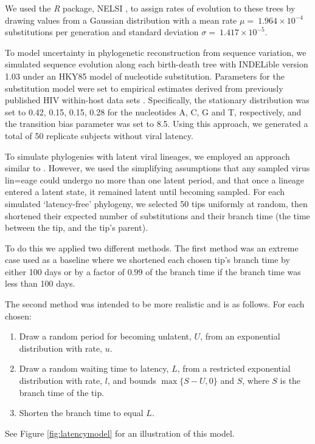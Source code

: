 \documentclass[12pt]{article}
\begin{document}
We used the \textit{R} package, NELSI \citep{NELSI}, to assign rates of evolution to these trees by drawing values from a Gaussian distribution with a mean rate $\mu = \ 1.964\times 10^{-4}$ substitutions per generation and standard deviation $\sigma = \ 1.417\times 10^{-5}$. %

To model uncertainty in phylogenetic reconstruction from sequence variation, we simulated sequence evolution along each birth-death tree with INDELible version 1.03 \citep{Indelible09} under an HKY85 \citep{HKY85} model of nucleotide substitution.
Parameters for the substitution model were set to empirical estimates derived from previously published HIV within-host data sets \citep{McCloskey14}. 
Specifically, the stationary distribution was set to 0.42, 0.15, 0.15, 0.28 for the nucleotides A, C, G and T, respectively, and the transition bias parameter was set to 8.5. Using this approach, we generated a total of 50 replicate subjects without viral latency. 


To simulate phylogenies with latent viral lineages, we employed an approach similar to  \citet{Immonen14}. 
However, we used the simplifying assumptions that any sampled virus lin=eage could undergo no more than one latent period, and that once a lineage entered a latent state, it remained latent until becoming sampled.
For each simulated `latency-free' phylogeny, we selected 50 tips uniformly at random, then shortened their expected number of substitutions and their branch time (the time between the tip, and the tip's parent).

To do this we applied two different methods. The first method was an extreme case used as a baseline where we shortened each chosen tip's branch time by either 100 days or by a factor of $0.99$ of the branch time if the branch time was less than 100 days.

The second method was intended to be more realistic and is as follows. For each chosen:
\begin{enumerate}
\item Draw a random period for becoming unlatent, $U$, from an exponential distribution with rate, $u$.
\item Draw a random waiting time to latency, $L$, from a restricted exponential distribution with rate, $l$, and bounds $\max\{S-U, 0\}$ and $S$, where $S$ is the branch time of the tip.
\item Shorten the branch time to equal $L$.
\end{enumerate}
See Figure \ref{fig:latencymodel} for an illustration of this model.
\end{document}
